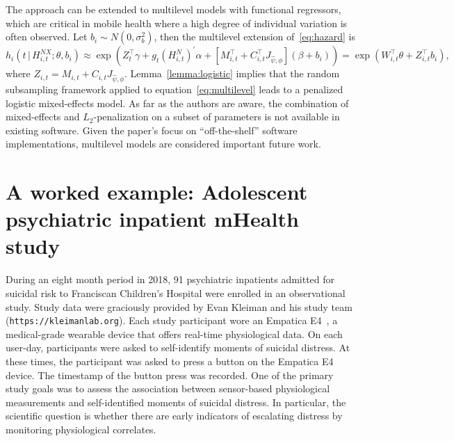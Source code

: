 \documentclass[12pt]{amsart}
\def\given{\, | \,}
\begin{document}
The approach can be extended to multilevel models with functional regressors, which are critical in mobile health where a high degree of individual variation is often observed.  Let $b_i \sim N(0, \sigma_{b}^2)$, then the multilevel extension of~\eqref{eq:hazard} is
\begin{equation}
\label{eq:multilevel}
h_i \left( t \given  H_{i,t}^{NX} ; \theta, b_i \right) \approx
\exp \left( Z_{t}^\top \gamma + g_t \left( H_{i,t}^{N} \right)^{\prime} \alpha
  + \left[ M_{i,t}^\top + C_{i,t}^\top J_{\hat \psi, \phi}\right] (\beta + b_i) \right)
= \exp \left( W_{i,t}^\top \theta  + Z_{i,t}^\top b_i \right),
\end{equation}
where $Z_{i,t} = M_{i,t} + C_{i,t} J_{\hat \psi, \phi}$. Lemma~\ref{lemma:logistic} implies that the random subsampling framework applied to equation~\eqref{eq:multilevel} leads to a penalized logistic mixed-effects model.  As far as the authors are aware, the combination of mixed-effects and $L_2$-penalization on a subset of parameters is not available in existing software.
Given the paper's focus on ``off-the-shelf'' software implementations, multilevel models are considered important future work.

\section{A worked example: Adolescent psychiatric inpatient mHealth study} \label{section:example}

During an eight month period in 2018, 91 psychiatric inpatients admitted for suicidal risk to Franciscan Children's Hospital were enrolled in an observational study.  Study data were graciously provided by Evan Kleiman and his study team ({\tt https://kleimanlab.org}). Each study participant wore an Empatica E4~\citep{empaticae3}, a medical-grade wearable device that offers real-time physiological data.  On each user-day, participants were asked to self-identify moments of suicidal distress.  At these times, the participant was asked to press a button on the Empatica E4 device.  The timestamp of the button press was recorded.  One of the primary study goals was to assess the association between sensor-based physiological measurements and self-identified moments of suicidal distress. In particular, the scientific question is whether there are early indicators of escalating distress by monitoring physiological correlates.
\end{document}
